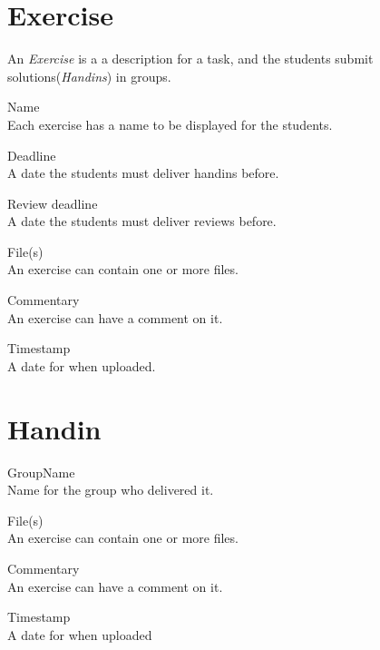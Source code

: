 \documentclass[Main]{subfiles}
\begin{document}

\section{Exercise}
An \textit{Exercise} is a a description for a task, and the students submit solutions(\textit{Handins}) in groups.
\begin{DataIntro}
\rExample{}
\end{DataIntro}

\newpage
\begin{DataTable}

\Record
{Name\\Each exercise has a name to be displayed for the students.}
{}
{}

\Record
{Deadline\\A date the students must deliver handins before.}
{}
{}

\Record
{Review deadline\\A date the students must deliver reviews before.}
{}
{}

\Record
{File(s)\\An exercise can contain one or more files.}
{}
{}


\Record
{Commentary\\An exercise can have a comment on it.}
{}
{}


\Record
{Timestamp\\A date for when uploaded.}
{}
{}
\end{DataTable}





\section{Handin}

	
\begin{DataIntro}
\rExample{}
\end{DataIntro}

\begin{DataTable}

\Record
{GroupName\\Name for the group who delivered it.}
{}
{}

\Record
{File(s)\\An exercise can contain one or more files.}
{}
{}


\Record
{Commentary\\An exercise can have a comment on it.}
{}
{}


\Record
{Timestamp\\}
{A date for when uploaded}
{}
\end{DataTable}
\end{document}
